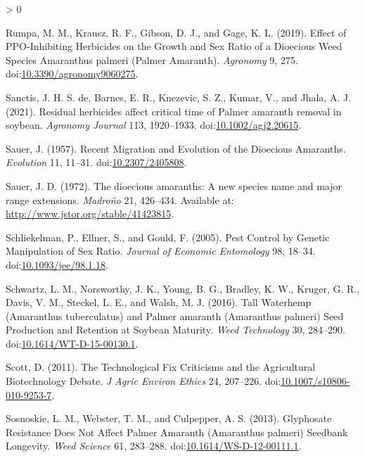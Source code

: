 \documentclass[utf8]{frontiersSCNS}
\newlength{\cslhangindent}
\newenvironment{CSLReferences}[2] %
 {%
  \setlength{\parindent}{0pt}
  \ifodd #1 \everypar{\setlength{\hangindent}{\cslhangindent}}\ignorespaces\fi
  \ifnum #2 > 0
  \setlength{\parskip}{#2\baselineskip}
  \fi
 }%
 {}
\begin{document}
\begin{CSLReferences}{1}{0}
\leavevmode\hypertarget{ref-rumpa2019}{}%
Rumpa, M. M., Krausz, R. F., Gibson, D. J., and Gage, K. L. (2019).
Effect of {PPO}-{Inhibiting Herbicides} on the {Growth} and {Sex Ratio}
of a {Dioecious Weed Species Amaranthus} palmeri ({Palmer Amaranth}).
\emph{Agronomy} 9, 275.
doi:\href{https://doi.org/10.3390/agronomy9060275}{10.3390/agronomy9060275}.

\leavevmode\hypertarget{ref-sanctis2021}{}%
Sanctis, J. H. S. de, Barnes, E. R., Knezevic, S. Z., Kumar, V., and
Jhala, A. J. (2021). Residual herbicides affect critical time of
{Palmer} amaranth removal in soybean. \emph{Agronomy Journal} 113,
1920--1933.
doi:\href{https://doi.org/10.1002/agj2.20615}{10.1002/agj2.20615}.

\leavevmode\hypertarget{ref-sauer1957}{}%
Sauer, J. (1957). Recent {Migration} and {Evolution} of the {Dioecious
Amaranths}. \emph{Evolution} 11, 11--31.
doi:\href{https://doi.org/10.2307/2405808}{10.2307/2405808}.

\leavevmode\hypertarget{ref-sauer1972}{}%
Sauer, J. D. (1972). The dioecious amaranths: A new species name and
major range extensions. \emph{Madroño} 21, 426--434. Available at:
\url{http://www.jstor.org/stable/41423815}.

\leavevmode\hypertarget{ref-schliekelman2005}{}%
Schliekelman, P., Ellner, S., and Gould, F. (2005). Pest {Control} by
{Genetic Manipulation} of {Sex Ratio}. \emph{Journal of Economic
Entomology} 98, 18--34.
doi:\href{https://doi.org/10.1093/jee/98.1.18}{10.1093/jee/98.1.18}.

\leavevmode\hypertarget{ref-schwartz2016}{}%
Schwartz, L. M., Norsworthy, J. K., Young, B. G., Bradley, K. W.,
Kruger, G. R., Davis, V. M., Steckel, L. E., and Walsh, M. J. (2016).
Tall {Waterhemp} ({Amaranthus} tuberculatus) and {Palmer} amaranth
({Amaranthus} palmeri) {Seed Production} and {Retention} at {Soybean
Maturity}. \emph{Weed Technology} 30, 284--290.
doi:\href{https://doi.org/10.1614/WT-D-15-00130.1}{10.1614/WT-D-15-00130.1}.

\leavevmode\hypertarget{ref-scott2011}{}%
Scott, D. (2011). The {Technological Fix Criticisms} and the
{Agricultural Biotechnology Debate}. \emph{J Agric Environ Ethics} 24,
207--226.
doi:\href{https://doi.org/10.1007/s10806-010-9253-7}{10.1007/s10806-010-9253-7}.

\leavevmode\hypertarget{ref-sosnoskie2013}{}%
Sosnoskie, L. M., Webster, T. M., and Culpepper, A. S. (2013).
Glyphosate {Resistance Does Not Affect Palmer Amaranth} ({Amaranthus}
palmeri) {Seedbank Longevity}. \emph{Weed Science} 61, 283--288.
doi:\href{https://doi.org/10.1614/WS-D-12-00111.1}{10.1614/WS-D-12-00111.1}.


\end{CSLReferences}
\end{document}
